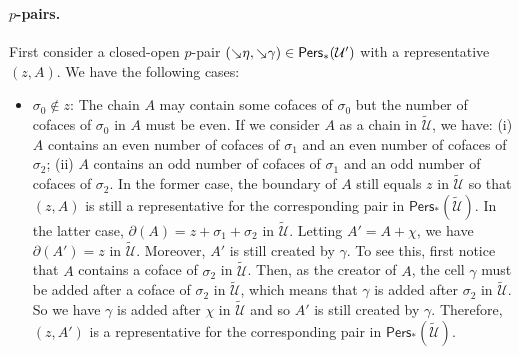 \documentclass[letterpaper,11pt]{article}
\theoremstyle{mythmstyle}
\theoremstyle{mydefstyle}
\theoremstyle{plain}
\theoremstyle{definition}
\newcommand{\Pers}{\mathsf{Pers}}
\newcommand{\<}[1]{\langle #1\rangle}
\newcommand{\add}[1]{\mskip-2.5mu\rotatebox[origin=c]{-45}{${\rightarrow}$}{#1}}
\newcommand{\Ucal}{\mathcal{U}}
\newcommand{\sG}{\sigma}
\newcommand{\Dim}{p}
\newcommand{\extsimp}{\chi}
\begin{document}
\paragraph{$\Dim$-pairs.}
First consider a  closed-open $\Dim$-pair $(\add{\eta},\add{\gamma})\in\Pers_*({\Ucal}')$
with a representative  $(z,A)$.
We have the following cases:
\begin{itemize}
    \item $\sG_0\not\in z$:
    The chain $A$ may contain some cofaces of $\sG_0$ 
    but the number of cofaces of $\sG_0$ in $A$ must be even.
    If we consider $A$ as a  chain in $\tilde{\Ucal}$,
    we have: (i) $A$ contains an even number of cofaces of $\sG_1$ 
    and an even number of cofaces of $\sG_2$;
    (ii) $A$ contains an odd number of cofaces of $\sG_1$ 
    and an odd number of cofaces of $\sG_2$.
    In the former case,  the boundary of $A$ still equals $z$ in $\tilde{\Ucal}$
    so that 
    $(z,A)$ is still a  representative for 
    the corresponding pair in
    $\Pers_*(\tilde{\Ucal})$.
    In the latter case, $\partial(A)=z+\sG_1+\sG_2$ in $\tilde{\Ucal}$.
    Letting $A'=A+\extsimp$, we have $\partial(A')=z$ in $\tilde{\Ucal}$.
    Moreover, $A'$ is still  created by $\gamma$.
    To see this,
    first notice that $A$ contains
    a coface of $\sG_2$ in $\tilde{\Ucal}$.
    Then,
    as the creator of $A$, the cell $\gamma$ must be added
    after a coface of $\sG_2$
    in $\tilde{\Ucal}$,
    which means that $\gamma$ is added after $\sG_2$
    in $\tilde{\Ucal}$.
    So we have $\gamma$ is added after 
    ${\extsimp}$ in $\tilde{\Ucal}$
    and so $A'$ is still  created by $\gamma$.
    Therefore, $(z,A')$ is a representative for 
    the corresponding pair in
    $\Pers_*(\tilde{\Ucal})$.
    

\end{itemize}
\end{document}
